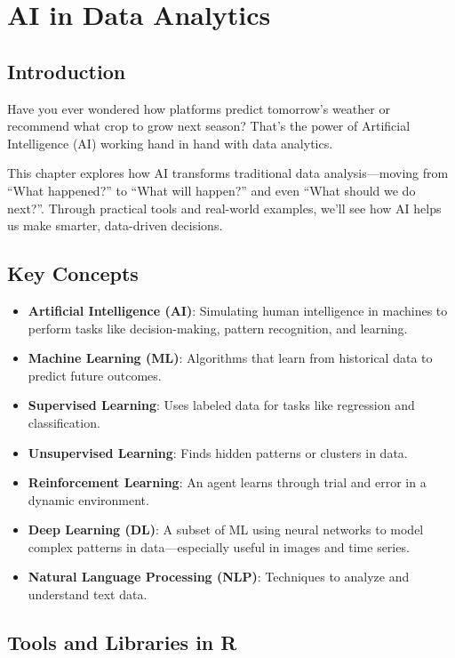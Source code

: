 \chapter{AI in Data Analytics}

\section{Introduction}
Have you ever wondered how platforms predict tomorrow’s weather or recommend what crop to grow next season? That’s the power of Artificial Intelligence (AI) working hand in hand with data analytics.

This chapter explores how AI transforms traditional data analysis—moving from “What happened?” to “What will happen?” and even “What should we do next?”. Through practical tools and real-world examples, we’ll see how AI helps us make smarter, data-driven decisions.

\section{Key Concepts}

\begin{itemize}
  \item \textbf{Artificial Intelligence (AI)}: Simulating human intelligence in machines to perform tasks like decision-making, pattern recognition, and learning.
  \item \textbf{Machine Learning (ML)}: Algorithms that learn from historical data to predict future outcomes.
  \item \textbf{Supervised Learning}: Uses labeled data for tasks like regression and classification.
  \item \textbf{Unsupervised Learning}: Finds hidden patterns or clusters in data.
  \item \textbf{Reinforcement Learning}: An agent learns through trial and error in a dynamic environment.
  \item \textbf{Deep Learning (DL)}: A subset of ML using neural networks to model complex patterns in data—especially useful in images and time series.
  \item \textbf{Natural Language Processing (NLP)}: Techniques to analyze and understand text data.
\end{itemize}

\section{Tools and Libraries in R}

